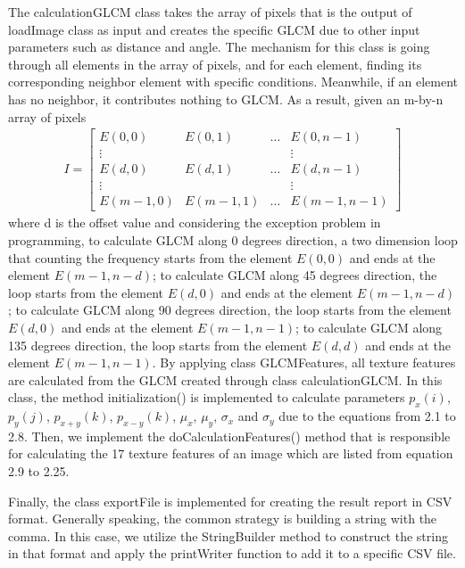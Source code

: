 The calculationGLCM class takes the array of pixels that is the output of loadImage class as input and creates the specific GLCM due to other input parameters such as distance and angle. The mechanism for this class is going through all elements in the array of pixels, and for each element, finding its corresponding neighbor element with specific conditions. Meanwhile, if an element has no neighbor, it contributes nothing to GLCM. As a result, given an m-by-n array of pixels
\begin{align*}
I = 
\begin{bmatrix}
E(0,0) & E(0,1) & \ldots & E(0,n-1) \\
\vdots &         &         & \vdots \\
E(d,0) & E(d,1) & \ldots & E(d,n-1) \\
\vdots &         &         & \vdots \\
E(m-1,0) & E(m-1,1) & \ldots & E(m-1,n-1) 
\end{bmatrix}
\end{align*} where d is the offset value and considering the exception problem in programming,
to calculate GLCM along 0 degrees direction, a two dimension loop that counting the frequency starts from the element $E(0,0)$ and ends at the element $E(m-1, n-d)$; to calculate GLCM along 45 degrees direction, the loop starts from the element $E(d,0)$ and ends at the element $E(m-1, n-d)$; to calculate GLCM along 90 degrees direction, the loop starts from the element $E(d,0)$ and ends at the element $E(m-1, n-1)$; to calculate GLCM along 135 degrees direction, the loop starts from the element $E(d,d)$ and ends at the element $E(m-1, n-1)$. 
By applying class GLCMFeatures, all texture features are calculated from the GLCM created through class calculationGLCM. In this class, the method initialization() is implemented to calculate parameters $p_x(i)$, $p_y(j)$, $p_{x+y}(k)$, $p_{x-y}(k)$, $\mu_x$, $\mu_y$, $\sigma_x$ and $\sigma_y$ due to the equations from 2.1 to 2.8. Then, we implement the doCalculationFeatures() method that is responsible for calculating the 17 texture features of an image which are listed from equation 2.9 to 2.25.\par
Finally, the class exportFile is implemented for creating the result report in CSV format. Generally speaking, the common strategy is building a string with the comma. In this case, we utilize the StringBuilder method to construct the string in that format and apply the printWriter function to add it to a specific CSV file. 

